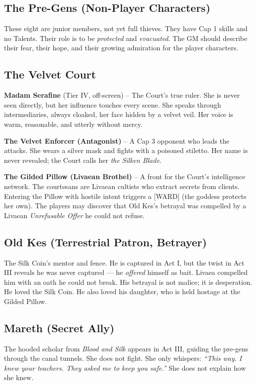\documentclass[10pt,twoside]{book}
\newcommand{\tag}[1]{\textsc{[#1]}}
\begin{document}
\subsection{The Pre-Gens (Non-Player Characters)}
These eight are junior members, not yet full thieves. They have Cap 1 skills and no Talents. Their role is to be \textit{protected} and \textit{evacuated}. The GM should describe their fear, their hope, and their growing admiration for the player characters.

\subsection{The Velvet Court}

\textbf{Madam Serafine} (Tier IV, off-screen) -- The Court's true ruler. She is never seen directly, but her influence touches every scene. She speaks through intermediaries, always cloaked, her face hidden by a velvet veil. Her voice is warm, reasonable, and utterly without mercy.

\textbf{The Velvet Enforcer (Antagonist)} -- A Cap 3 opponent who leads the attacks. She wears a silver mask and fights with a poisoned stiletto. Her name is never revealed; the Court calls her \textit{the Silken Blade}.

\textbf{The Gilded Pillow (Livaean Brothel)} -- A front for the Court's intelligence network. The courtesans are Livaean cultists who extract secrets from clients. Entering the Pillow with hostile intent triggers a \tag{WARD} (the goddess protects her own). The players may discover that Old Kes's betrayal was compelled by a Livaean \textit{Unrefusable Offer} he could not refuse.

\subsection{Old Kes (Terrestrial Patron, Betrayer)}
The Silk Coin's mentor and fence. He is captured in Act I, but the twist in Act III reveals he was never captured --- he \textit{offered} himself as bait. Livaea compelled him with an oath he could not break. His betrayal is not malice; it is desperation. He loved the Silk Coin. He also loved his daughter, who is held hostage at the Gilded Pillow.

\subsection{Mareth (Secret Ally)}
The hooded scholar from \textit{Blood and Silk} appears in Act III, guiding the pre-gens through the canal tunnels. She does not fight. She only whispers: \textit{``This way. I knew your teachers. They asked me to keep you safe.''} She does not explain how she knew.
\end{document}
